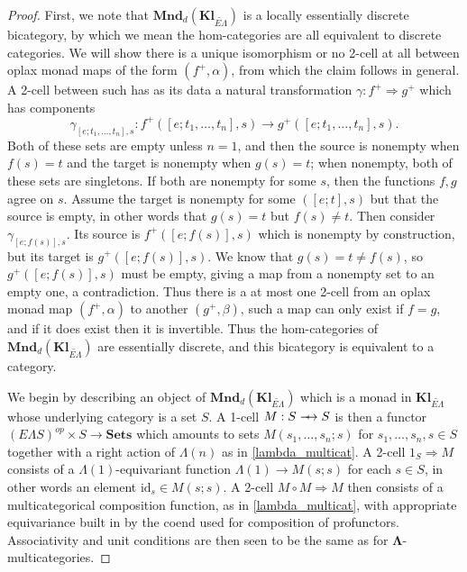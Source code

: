 \documentclass{amsbook} %
\newcommand{\mb}{\mathbf}
\newcommand{\id}{\textrm{id}}
\def\srarrow{\relbar\joinrel\mapstochar\joinrel\rightarrow}
\numberwithin{section}{chapter}
\begin{document}
\begin{proof}
First, we note that $\mb{Mnd}_{d}(\mb{Kl}_{\widetilde{E\Lambda}})$ is a locally essentially discrete bicategory, by which we mean the hom-categories are all equivalent to discrete categories.  We will show there is a unique isomorphism or no 2-cell at all between oplax monad maps of the form $(f^{+}, \alpha)$, from which the claim follows in general.  A 2-cell between such has as its data a natural transformation $\gamma: f^{+} \Rightarrow g^{+}$ which has components
\[
\gamma_{[e; t_1, \ldots, t_n], s}:f^{+}([e; t_1, \ldots, t_n], s) \to g^{+}([e; t_1, \ldots, t_n], s).
\]
Both of these sets are empty unless $n=1$, and then the source is nonempty when $f(s) = t$ and the target is nonempty when $g(s)=t$; when nonempty, both of these sets are singletons.  If both are nonempty for some $s$, then the functions $f,g$ agree on $s$.  Assume the target is nonempty for some $([e;t], s)$ but that the source is empty, in other words that $g(s)=t$ but $f(s) \neq t$.  Then consider $\gamma_{[e;f(s)], s}$.  Its source is $f^{+}([e;f(s)], s)$ which is nonempty by construction, but its target is $g^{+}([e;f(s)], s)$.  We know that $g(s) = t \neq f(s)$, so $g^{+}([e;f(s)], s)$ must be empty, giving a map from a nonempty set to an empty one, a contradiction.  Thus there is a at most one 2-cell from an oplax monad map $(f^{+}, \alpha)$ to another $(g^{+}, \beta)$, such a map can only exist if $f = g$, and if it does exist then it is invertible.  Thus the hom-categories of $\mb{Mnd}_{d}(\mb{Kl}_{\widetilde{E\Lambda}})$ are essentially discrete, and this bicategory is equivalent to a category.

We begin by describing an object of $\mb{Mnd}_{d}(\mb{Kl}_{\widetilde{E\Lambda}})$ which is a monad in $\mb{Kl}_{\widetilde{E\Lambda}}$ whose underlying category is a set $S$.  A 1-cell $M:S \srarrow S$ is then a functor $(E\Lambda S)^{op} \times S \to \mb{Sets}$ which amounts to sets $M(s_1, \ldots, s_n; s)$ for $s_1, \ldots, s_n, s \in S$ together with a right action of $\Lambda(n)$ as in \ref{lambda_multicat}.  A 2-cell $1_{S} \Rightarrow M$ consists of a $\Lambda(1)$-equivariant function $\Lambda(1) \to M(s;s)$ for each $s \in S$, in other words an element $\id_{s} \in M(s;s)$.  A 2-cell $M \circ M \Rightarrow M$ then consists of a multicategorical composition function, as in \ref{lambda_multicat}, with appropriate equivariance built in by the coend used for composition of profunctors.  Associativity and unit conditions are then seen to be the same as for $\mb{\Lambda}$-multicategories.


\end{proof}
\end{document}

